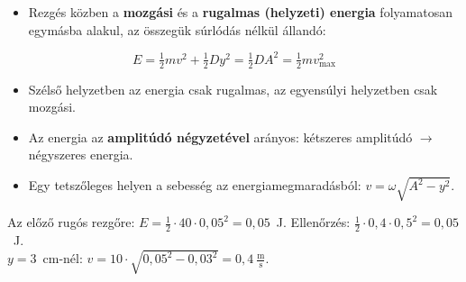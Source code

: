 \documentclass[12pt]{article}
\begin{document}
\begin{minipage}[t]{0.52\linewidth}\vspace{0pt}
\begin{itemize}
  \item Rezgés közben a \textbf{mozgási} és a \textbf{rugalmas (helyzeti) energia} folyamatosan
    egymásba alakul, az összegük súrlódás nélkül állandó:
\end{itemize}
\begin{fontos}
\[ E = \tfrac12 mv^2 + \tfrac12 Dy^2 = \tfrac12 DA^2 = \tfrac12 m v_\text{max}^2 \]
\end{fontos}
\begin{itemize}
  \item Szélső helyzetben az energia csak rugalmas, az egyensúlyi helyzetben csak mozgási.
  \item Az energia az \textbf{amplitúdó négyzetével} arányos: kétszeres amplitúdó $\to$
    négyszeres energia.
  \item Egy tetszőleges helyen a sebesség az energiamegmaradásból:
    $v = \omega\sqrt{A^2 - y^2}$.
\end{itemize}
\begin{pelda}
Az előző rugós rezgőre: $E = \tfrac12\cdot 40\cdot 0{,}05^2 = 0{,}05$~J. Ellenőrzés:
$\tfrac12\cdot 0{,}4\cdot 0{,}5^2 = 0{,}05$~J. \checkmark\\
$y = 3$~cm-nél: $v = 10\cdot\sqrt{0{,}05^2 - 0{,}03^2} = 0{,}4~\tfrac{\text{m}}{\text{s}}$.
\end{pelda}
\end{minipage}\hfill
\begin{minipage}[t]{0.45\linewidth}\vspace{0pt}\centering
{}
\end{minipage}
\end{document}
